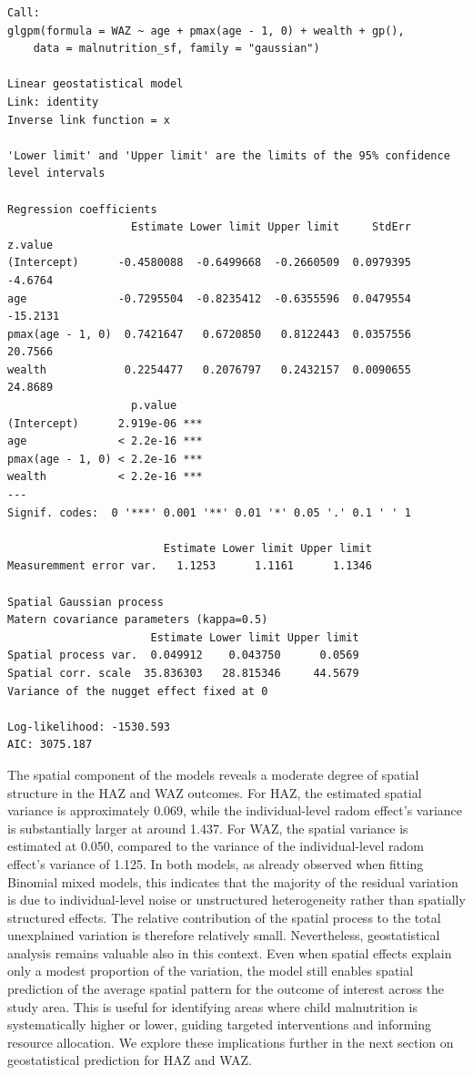 \documentclass[
  letterpaper,
]{krantz}
\begin{document}
\begin{verbatim}
Call:
glgpm(formula = WAZ ~ age + pmax(age - 1, 0) + wealth + gp(), 
    data = malnutrition_sf, family = "gaussian")

Linear geostatistical model
Link: identity 
Inverse link function = x 
 
'Lower limit' and 'Upper limit' are the limits of the 95% confidence level intervals

Regression coefficients
                   Estimate Lower limit Upper limit     StdErr  z.value
(Intercept)      -0.4580088  -0.6499668  -0.2660509  0.0979395  -4.6764
age              -0.7295504  -0.8235412  -0.6355596  0.0479554 -15.2131
pmax(age - 1, 0)  0.7421647   0.6720850   0.8122443  0.0357556  20.7566
wealth            0.2254477   0.2076797   0.2432157  0.0090655  24.8689
                   p.value    
(Intercept)      2.919e-06 ***
age              < 2.2e-16 ***
pmax(age - 1, 0) < 2.2e-16 ***
wealth           < 2.2e-16 ***
---
Signif. codes:  0 '***' 0.001 '**' 0.01 '*' 0.05 '.' 0.1 ' ' 1

                        Estimate Lower limit Upper limit
Measuremment error var.   1.1253      1.1161      1.1346

Spatial Gaussian process
Matern covariance parameters (kappa=0.5)
                      Estimate Lower limit Upper limit
Spatial process var.  0.049912    0.043750      0.0569
Spatial corr. scale  35.836303   28.815346     44.5679
Variance of the nugget effect fixed at 0

Log-likelihood: -1530.593
AIC: 3075.187
\end{verbatim}

The spatial component of the models reveals a moderate degree of spatial
structure in the HAZ and WAZ outcomes. For HAZ, the estimated spatial
variance is approximately 0.069, while the individual-level radom
effect's variance is substantially larger at around 1.437. For WAZ, the
spatial variance is estimated at 0.050, compared to the variance of the
individual-level radom effect's variance of 1.125. In both models, as
already observed when fitting Binomial mixed models, this indicates that
the majority of the residual variation is due to individual-level noise
or unstructured heterogeneity rather than spatially structured effects.
The relative contribution of the spatial process to the total
unexplained variation is therefore relatively small. Nevertheless,
geostatistical analysis remains valuable also in this context. Even when
spatial effects explain only a modest proportion of the variation, the
model still enables spatial prediction of the average spatial pattern
for the outcome of interest across the study area. This is useful for
identifying areas where child malnutrition is systematically higher or
lower, guiding targeted interventions and informing resource allocation.
We explore these implications further in the next section on
geostatistical prediction for HAZ and WAZ.
\end{document}
